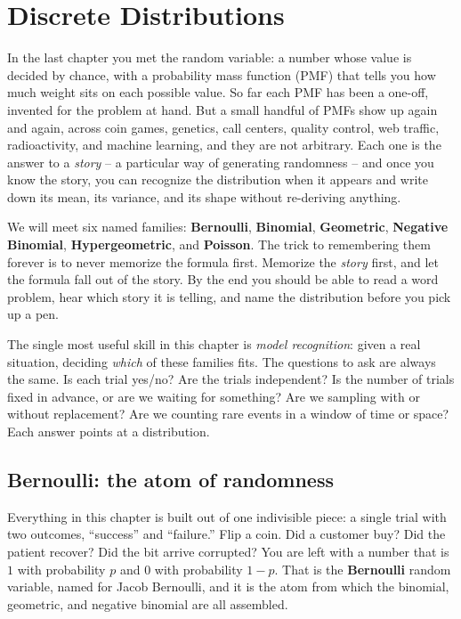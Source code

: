 \chapter{Discrete Distributions}

In the last chapter you met the random variable: a number whose value is decided
by chance, with a probability mass function (PMF) that tells you how much weight
sits on each possible value. So far each PMF has been a one-off, invented for the
problem at hand. But a small handful of PMFs show up again and again, across coin
games, genetics, call centers, quality control, web traffic, radioactivity, and
machine learning, and they are not arbitrary. Each one is the answer to a
\emph{story} -- a particular way of generating randomness -- and once you know the
story, you can recognize the distribution when it appears and write down its mean,
its variance, and its shape without re-deriving anything.

We will meet six named families: \textbf{Bernoulli}, \textbf{Binomial},
\textbf{Geometric}, \textbf{Negative Binomial}, \textbf{Hypergeometric}, and
\textbf{Poisson}. The trick to remembering them forever is to never memorize the
formula first. Memorize the \emph{story} first, and let the formula fall out of
the story. By the end you should be able to read a word problem, hear which story
it is telling, and name the distribution before you pick up a pen.

\begin{focusbox}
The single most useful skill in this chapter is \emph{model recognition}: given a
real situation, deciding \emph{which} of these families fits. The questions to ask
are always the same. Is each trial yes/no? Are the trials independent? Is the
number of trials fixed in advance, or are we waiting for something? Are we
sampling with or without replacement? Are we counting rare events in a window of
time or space? Each answer points at a distribution.
\end{focusbox}

\section{Bernoulli: the atom of randomness}
\label{ch07:bernoulli}

Everything in this chapter is built out of one indivisible piece: a single trial
with two outcomes, ``success'' and ``failure.'' Flip a coin. Did a customer buy?
Did the patient recover? Did the bit arrive corrupted? You are left with
a number that is $1$ with probability $p$ and $0$ with probability
$1-p$. That is the \textbf{Bernoulli} random variable, named for Jacob Bernoulli,
and it is the atom from which the binomial, geometric, and negative binomial are
all assembled.

